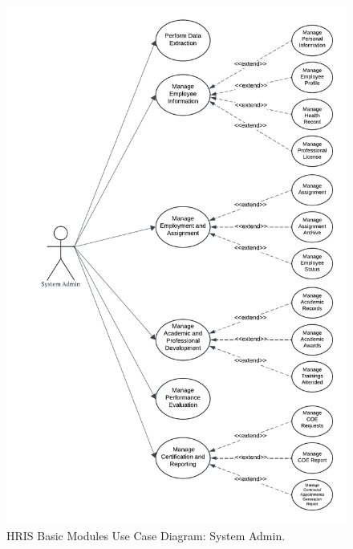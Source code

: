     \begin{figure}[H]
        \centering
        \includegraphics[width=0.9\linewidth]{figures/images/use-case-basic-1.png}
        \caption{HRIS Basic Modules Use Case Diagram: System Admin.}
        \label{fig:use-case-basic-1}
    \end{figure}

